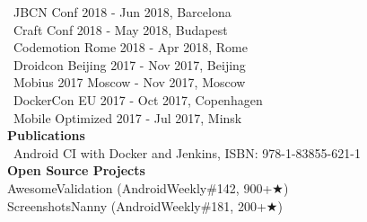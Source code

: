\documentclass[12pt, a4paper]{article}
\begin{document}
\faMicrophone\ JBCN Conf 2018 - Jun 2018, Barcelona \\

\faMicrophone\ Craft Conf 2018 - May 2018, Budapest \\

\faMicrophone\ Codemotion Rome 2018 - Apr 2018, Rome \\

\faMicrophone\ Droidcon Beijing 2017 - Nov 2017, Beijing \\

\faMicrophone\ Mobius 2017 Moscow - Nov 2017, Moscow \\

\faMicrophone\ DockerCon EU 2017 - Oct 2017, Copenhagen \\

\faMicrophone\ Mobile Optimized 2017 - Jul 2017, Minsk \\

\textcolor{highlightblue}{\textbf{\huge Publications}} \\

\faBook\ Android CI with Docker and Jenkins, ISBN: 978-1-83855-621-1 \\

\textcolor{highlightblue}{\textbf{\huge Open Source Projects}} \\

AwesomeValidation (AndroidWeekly\#142, 900+{\DejaVuSans ★}) \\

ScreenshotsNanny (AndroidWeekly\#181, 200+{\DejaVuSans ★}) \\
\end{document}
